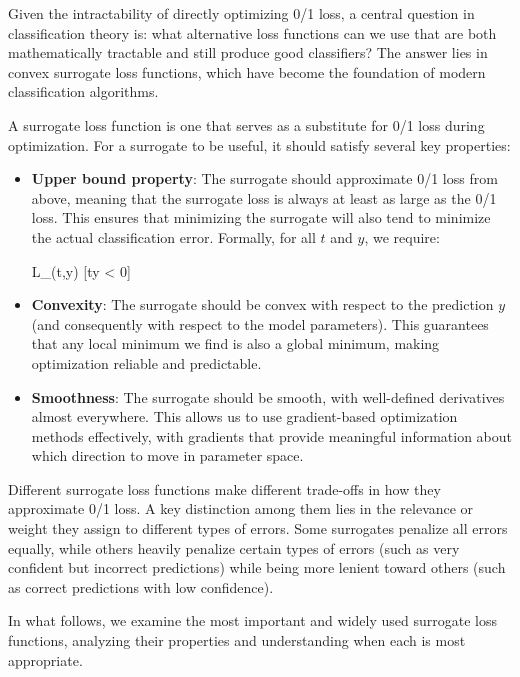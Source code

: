Given the intractability of directly optimizing 0/1 loss, a central question in classification theory is: what alternative loss functions can we use that are both mathematically tractable and still produce good classifiers? The answer lies in \alert{convex surrogate loss functions}, which have become the foundation of modern classification algorithms.

A surrogate loss function is one that serves as a substitute for 0/1 loss during optimization. For a surrogate to be useful, it should satisfy several key properties:

\begin{itemize}
\item \textbf{Upper bound property}: The surrogate should approximate 0/1 loss \alert{from above}, meaning that the surrogate loss is always at least as large as the 0/1 loss. This ensures that minimizing the surrogate will also tend to minimize the actual classification error. Formally, for all $t$ and $y$, we require:
\begin{myequation}
L_{}(t,y) [ty < 0]
\end{myequation}

\item \textbf{Convexity}: The surrogate should be convex with respect to the prediction $y$ (and consequently with respect to the model parameters). This guarantees that any local minimum we find is also a global minimum, making optimization reliable and predictable.

\item \textbf{Smoothness}: The surrogate should be smooth, with well-defined derivatives almost everywhere. This allows us to use gradient-based optimization methods effectively, with gradients that provide meaningful information about which direction to move in parameter space.
\end{itemize}

Different surrogate loss functions make different trade-offs in how they approximate 0/1 loss. A key distinction among them lies in the relevance or weight they assign to different types of errors. Some surrogates penalize all errors equally, while others heavily penalize certain types of errors (such as very confident but incorrect predictions) while being more lenient toward others (such as correct predictions with low confidence).

In what follows, we examine the most important and widely used surrogate loss functions, analyzing their properties and understanding when each is most appropriate.

